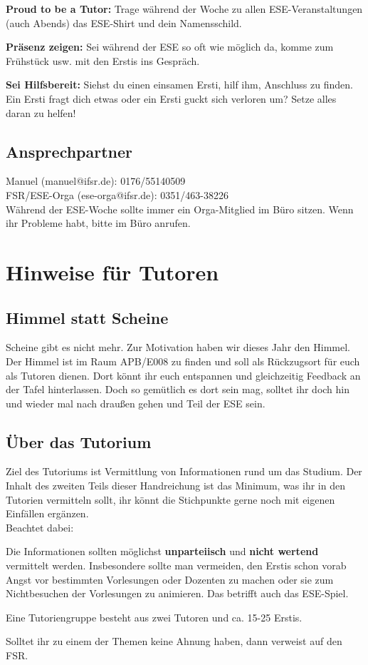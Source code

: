 \documentclass[a4paper,12pt]{report}
\begin{document}
\begin{itemize*}
    \item \textbf{Proud to be a Tutor:} Trage während der Woche zu allen ESE-Veranstaltungen (auch Abends) das ESE-Shirt und dein Namensschild.
    \item \textbf{Präsenz zeigen:} Sei während der ESE so oft wie möglich da, komme zum Frühstück usw. mit den Erstis ins Gespräch.
    \item \textbf{Sei Hilfsbereit:} Siehst du einen einsamen Ersti, hilf ihm, Anschluss zu finden. Ein Ersti fragt dich etwas oder ein Ersti guckt sich verloren um? Setze alles daran zu helfen!
\end{itemize*}

\section*{Ansprechpartner}
Manuel (manuel@ifsr.de): 0176/55140509 \\
FSR/ESE-Orga (ese-orga@ifsr.de): 0351/463-38226 \\

Während der ESE-Woche sollte immer ein Orga-Mitglied im Büro sitzen. Wenn ihr Probleme habt, bitte im Büro anrufen.

\tableofcontents
\chapter{Hinweise für Tutoren}
\section{Himmel statt Scheine}
Scheine gibt es nicht mehr. Zur Motivation haben wir dieses Jahr den Himmel. Der Himmel ist im Raum APB/E008 zu finden und soll als Rückzugsort für euch als Tutoren dienen. Dort könnt ihr euch entspannen und gleichzeitig Feedback an der Tafel hinterlassen. Doch so gemütlich es dort sein mag, solltet ihr doch hin und wieder mal nach draußen gehen und Teil der ESE sein.

\section{Über das Tutorium}
Ziel des Tutoriums ist Vermittlung von Informationen rund um das Studium. Der Inhalt des zweiten Teils dieser Handreichung ist das Minimum, was ihr in den Tutorien vermitteln sollt, ihr könnt die Stichpunkte gerne noch mit eigenen Einfällen ergänzen.\\
Beachtet dabei:
\begin{itemize*}
\item Die Informationen sollten möglichst \textbf{unparteiisch} und \textbf{nicht wertend} vermittelt werden.
Insbesondere sollte man vermeiden, den Erstis schon vorab Angst vor bestimmten Vorlesungen oder Dozenten zu machen oder sie zum Nichtbesuchen der Vorlesungen zu animieren. Das betrifft auch das ESE-Spiel.
\item Eine Tutoriengruppe besteht aus zwei Tutoren und ca. 15-25 Erstis.
\item Solltet ihr zu einem der Themen keine Ahnung haben, dann verweist auf den FSR.
\end{itemize*}
\end{document}
